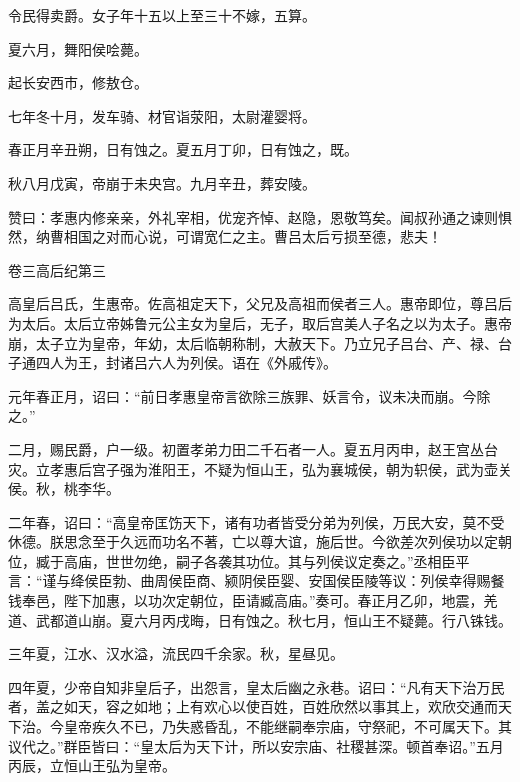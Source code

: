 \documentclass[12pt,UTF8]{ctexbook}
\begin{document}
令民得卖爵。女子年十五以上至三十不嫁，五算。



夏六月，舞阳侯哙薨。



起长安西市，修敖仓。



七年冬十月，发车骑、材官诣荥阳，太尉灌婴将。



春正月辛丑朔，日有蚀之。夏五月丁卯，日有蚀之，既。



秋八月戊寅，帝崩于未央宫。九月辛丑，葬安陵。



赞曰：孝惠内修亲亲，外礼宰相，优宠齐悼、赵隐，恩敬笃矣。闻叔孙通之谏则惧然，纳曹相国之对而心说，可谓宽仁之主。曹吕太后亏损至德，悲夫！





卷三高后纪第三



高皇后吕氏，生惠帝。佐高祖定天下，父兄及高祖而侯者三人。惠帝即位，尊吕后为太后。太后立帝姊鲁元公主女为皇后，无子，取后宫美人子名之以为太子。惠帝崩，太子立为皇帝，年幼，太后临朝称制，大赦天下。乃立兄子吕台、产、禄、台子通四人为王，封诸吕六人为列侯。语在《外戚传》。



元年春正月，诏曰：“前日孝惠皇帝言欲除三族罪、妖言令，议未决而崩。今除之。”



二月，赐民爵，户一级。初置孝弟力田二千石者一人。夏五月丙申，赵王宫丛台灾。立孝惠后宫子强为淮阳王，不疑为恒山王，弘为襄城侯，朝为轵侯，武为壶关侯。秋，桃李华。



二年春，诏曰：“高皇帝匡饬天下，诸有功者皆受分弟为列侯，万民大安，莫不受休德。朕思念至于久远而功名不著，亡以尊大谊，施后世。今欲差次列侯功以定朝位，臧于高庙，世世勿绝，嗣子各袭其功位。其与列侯议定奏之。”丞相臣平言：“谨与绛侯臣勃、曲周侯臣商、颍阴侯臣婴、安国侯臣陵等议：列侯幸得赐餐钱奉邑，陛下加惠，以功次定朝位，臣请臧高庙。”奏可。春正月乙卯，地震，羌道、武都道山崩。夏六月丙戌晦，日有蚀之。秋七月，恒山王不疑薨。行八铢钱。



三年夏，江水、汉水溢，流民四千余家。秋，星昼见。



四年夏，少帝自知非皇后子，出怨言，皇太后幽之永巷。诏曰：“凡有天下治万民者，盖之如天，容之如地；上有欢心以使百姓，百姓欣然以事其上，欢欣交通而天下治。今皇帝疾久不已，乃失惑昏乱，不能继嗣奉宗庙，守祭祀，不可属天下。其议代之。”群臣皆曰：“皇太后为天下计，所以安宗庙、社稷甚深。顿首奉诏。”五月丙辰，立恒山王弘为皇帝。
\end{document}

